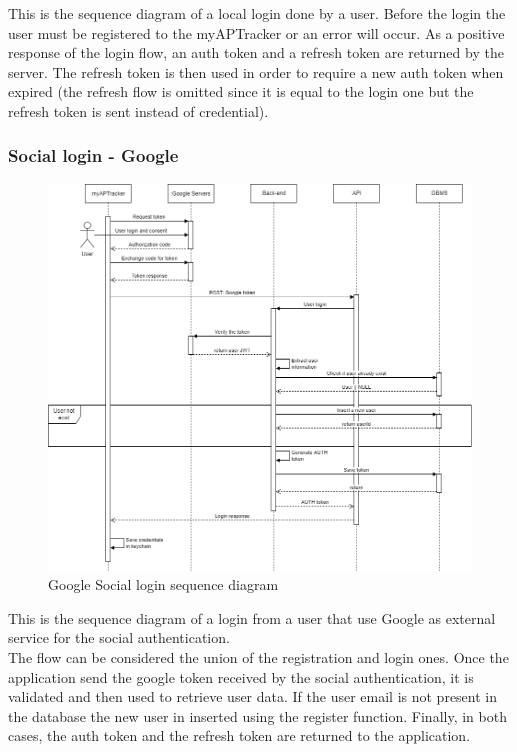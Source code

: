 This is the sequence diagram of a local login done by a user. Before the login the user must be registered to the myAPTracker or an error will occur.
As a positive response of the login flow, an auth token and a refresh token are returned by the server. The refresh token is then used in order to require a new auth token when expired (the refresh flow is omitted since it is equal to the login one but the refresh token is sent instead of credential).
\newpage
\subsubsection{Social login - Google}

\begin{figure}[h!]
        \centering
        \includegraphics[scale=0.40]{images/runtime_view/social_login_google.png}
        \caption{Google Social login sequence diagram}
        \label{fig:google_social_login_sequence_diagram}
\end{figure}
\FloatBarrier

This is the sequence diagram of a login from a user that use Google as external service for the social authentication.\\
The flow can be considered the union of the registration and login ones. Once the application send the google token received by the social authentication, it is validated and then used to retrieve user data. If the user email is not present in the database the new user in inserted using the register function.
Finally, in both cases, the auth token and the refresh token are returned to the application.
\newpage
